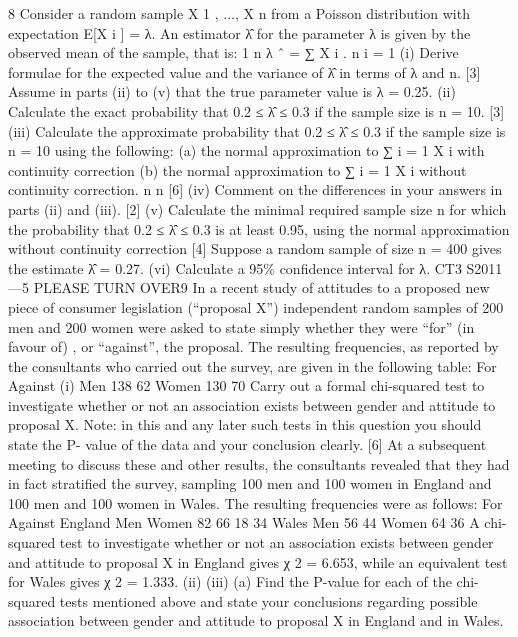 \documentclass[a4paper,12pt]{article}
\begin{document}
\begin{enumerate}
8
Consider a random sample X 1 , ..., X n from a Poisson distribution with expectation E[X i ] = λ. An estimator λ̂ for the parameter λ is given by the observed mean of the sample, that is:
1 n
λ ˆ = ∑ X i .
n i = 1
(i)
Derive formulae for the expected value and the variance of λ̂ in terms of λ and n.
[3]
Assume in parts (ii) to (v) that the true parameter value is λ = 0.25.
(ii) Calculate the exact probability that 0.2 ≤ λ̂ ≤ 0.3 if the sample size is n = 10.
[3]
(iii) Calculate the approximate probability that 0.2 ≤ λ̂ ≤ 0.3 if the sample size is
n = 10 using the following:
(a) the normal approximation to ∑ i = 1 X i with continuity correction
(b) the normal approximation to ∑ i = 1 X i without continuity correction.
n
n
[6]
(iv) Comment on the differences in your answers in parts (ii) and (iii).
[2]
(v) Calculate the minimal required sample size n for which the probability that 0.2 ≤ λ̂ ≤ 0.3 is at least 0.95, using the normal approximation without continuity correction
[4]
Suppose a random sample of size n = 400 gives the estimate λ̂ = 0.27.
(vi)
Calculate a 95\% confidence interval for λ.
CT3 S2011—5
PLEASE TURN OVER9
In a recent study of attitudes to a proposed new piece of consumer legislation (“proposal X”) independent random samples of 200 men and 200 women were asked to state simply whether they were “for” (in favour of) , or “against”, the proposal.
The resulting frequencies, as reported by the consultants who carried out the survey, are given in the following table:
For
Against
(i)
Men
138
62
Women
130
70
Carry out a formal chi-squared test to investigate whether or not an association
exists between gender and attitude to proposal X.
Note: in this and any later such tests in this question you should state the P-
value of the data and your conclusion clearly.
[6]
At a subsequent meeting to discuss these and other results, the consultants revealed
that they had in fact stratified the survey, sampling 100 men and 100 women in
England and 100 men and 100 women in Wales. The resulting frequencies were as
follows:
For
Against
England
Men
Women
82
66
18
34
Wales
Men
56
44
Women
64
36
A chi-squared test to investigate whether or not an association exists between gender
and attitude to proposal X in England gives χ 2 = 6.653, while an equivalent test for
Wales gives χ 2 = 1.333.
(ii)
(iii)
(a) Find the P-value for each of the chi-squared tests mentioned above and state your conclusions regarding possible association between gender and attitude to proposal X in England and in Wales.

\end{enumerate}
\end{document}

